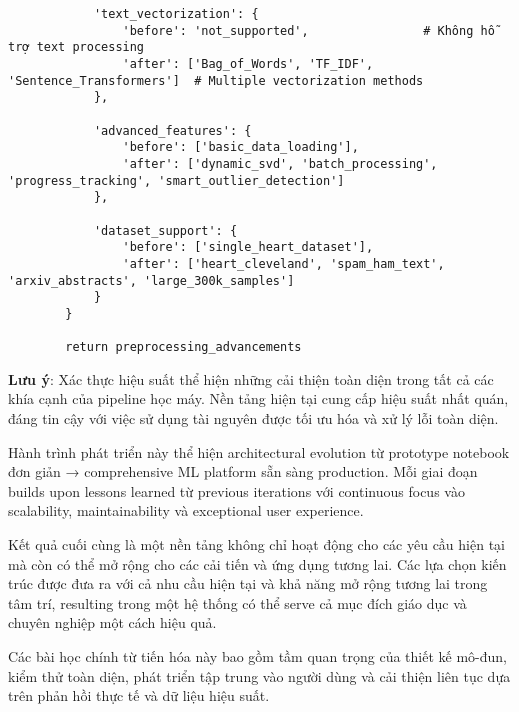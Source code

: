 \begin{verbatim}
            'text_vectorization': {
                'before': 'not_supported',                # Không hỗ trợ text processing
                'after': ['Bag_of_Words', 'TF_IDF', 'Sentence_Transformers']  # Multiple vectorization methods
            },
            
            'advanced_features': {
                'before': ['basic_data_loading'],
                'after': ['dynamic_svd', 'batch_processing', 'progress_tracking', 'smart_outlier_detection']
            },
            
            'dataset_support': {
                'before': ['single_heart_dataset'],
                'after': ['heart_cleveland', 'spam_ham_text', 'arxiv_abstracts', 'large_300k_samples']
            }
        }
        
        return preprocessing_advancements
\end{verbatim}

\textbf{Lưu ý}: Xác thực hiệu suất thể hiện những cải thiện toàn diện trong tất cả các khía cạnh của pipeline học máy. Nền tảng hiện tại cung cấp hiệu suất nhất quán, đáng tin cậy với việc sử dụng tài nguyên được tối ưu hóa và xử lý lỗi toàn diện.

\noindent
Hành trình phát triển này thể hiện architectural evolution từ prototype notebook đơn giản → comprehensive ML platform sẵn sàng production. Mỗi giai đoạn builds upon lessons learned từ previous iterations với continuous focus vào scalability, maintainability và exceptional user experience.

Kết quả cuối cùng là một nền tảng không chỉ hoạt động cho các yêu cầu hiện tại mà còn có thể mở rộng cho các cải tiến và ứng dụng tương lai. Các lựa chọn kiến trúc được đưa ra với cả nhu cầu hiện tại và khả năng mở rộng tương lai trong tâm trí, resulting trong một hệ thống có thể serve cả mục đích giáo dục và chuyên nghiệp một cách hiệu quả.

Các bài học chính từ tiến hóa này bao gồm tầm quan trọng của thiết kế mô-đun, kiểm thử toàn diện, phát triển tập trung vào người dùng và cải thiện liên tục dựa trên phản hồi thực tế và dữ liệu hiệu suất.